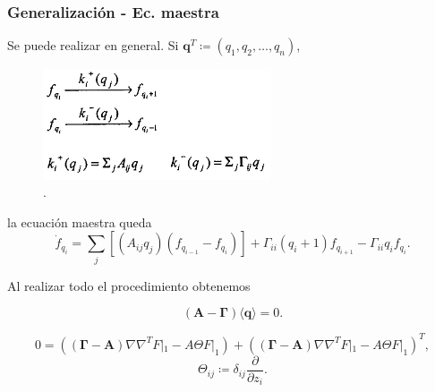 \documentclass{beamer}
\begin{document}
\begin{frame}
\frametitle{Generalizaci\'on - Ec. maestra}
Se puede realizar en general. Si $\mathbf{q}^T \coloneqq (q_1,q_2,\dots,q_n)$, 
\begin{figure}[p]
    \centering
    \includegraphics[width=0.6\textwidth]{scheme2.png}\\
    \tiny \cite{thattai01}.
\end{figure}
la ecuaci\'on maestra queda
\begin{equation*}
\dot{f}_{q_i} = \sum_j \left[\left(A_{ij}q_j\right) \left(f_{q_{i-1}} - f_{q_i}\right)\right] + \Gamma_{ii}(q_i+1)f_{q_{i+1}} -\Gamma_{ii}q_if_{q_i}.
\end{equation*}
\end{frame}

\begin{frame}

Al realizar todo el procedimiento obtenemos

$$\left(\mathbf{A} - \mathbf{\Gamma}\right)\langle \mathbf{q} \rangle = 0.$$

$$0 = \left( \left( \mathbf{\Gamma} - \mathbf{A}\right) \nabla\nabla^TF|_1 - A\Theta F|_1 \right) +  \left( \left( \mathbf{\Gamma} - \mathbf{A}\right) \nabla\nabla^TF|_1 - A\Theta F|_1\right)^T,$$ 
$$\Theta_{ij} \coloneqq \delta_{ij}\frac{\partial}{\partial z_i}.$$


\end{frame}
\end{document}
